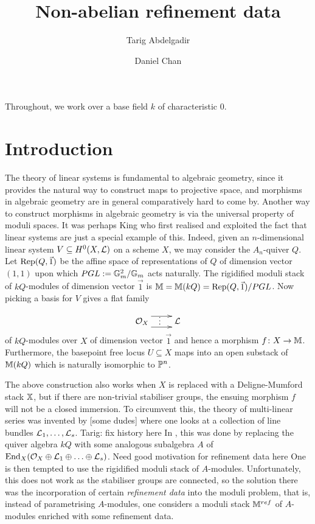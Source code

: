 \documentclass[12pt]{amsart}
\title{Non-abelian refinement data}
\author{Tarig Abdelgadir}
\author{Daniel Chan}
\begin{document}
\maketitle

Throughout, we work over a base field $k$ of characteristic 0.

\section{Introduction}
The theory of linear systems is fundamental to algebraic geometry, since it provides the natural way to construct maps to projective space, and morphisms in algebraic geometry are in general comparatively hard to come by. Another way to construct morphisms in algebraic geometry is via the universal property of moduli spaces. It was perhaps King who first realised and exploited the fact that linear systems are just a special example of this. Indeed, given an $n$-dimensional linear system $V \subseteq H^0(X,\mathcal{L})$ on a scheme $X$, we may consider the $A_n$-quiver $Q$. 
Let $\operatorname{Rep}(Q,\vec{1})$ be the affine space of representations of $Q$ of dimension vector $(1,1)$ upon which $PGL:= \mathbb{G}_m^2/\mathbb{G}_m$ acts naturally. The rigidified moduli stack of $kQ$-modules of dimension vector $\vec{1}$ is $\mathbb{M} = \mathbb{M}(kQ) = \operatorname{Rep}(Q,\vec{1})/PGL$. Now picking a basis for $V$ gives a flat family 
$$
\xymatrix{
\cO_X \ar@<1.5ex>[r] \ar@<-1.5ex>[r]^{\vdots} & \cL
}
$$
of $kQ$-modules over $X$ of dimension vector $\vec{1}$ and hence a morphism $f \colon X \to \mathbb{M}$. Furthermore, the basepoint free locus $U \subseteq X$ maps into an open substack of $\mathbb{M}(kQ)$ which is naturally isomorphic to $\mathbb{P}^n$. 

The above construction also works when $X$ is replaced with a Deligne-Mumford stack $\mathbb{X}$, but if there are non-trivial stabiliser groups, the ensuing morphism $f$ will not be a closed immersion. 
To circumvent this, the theory of multi-linear series was invented by [some dudes] where one looks at a collection of line bundles $\mathcal{L}_1, \ldots, \mathcal{L}_s$. {\red Tarig: fix history here} In \cite{Abd}, this was done by replacing the quiver algebra $kQ$ with some analogous subalgebra $A$ of $\operatorname{End}_X (\mathcal{O}_X \oplus \mathcal{L}_1 \oplus \ldots \oplus \mathcal{L}_s)$. 
{\red Need good motivation for refinement data here} 
One is then tempted to use the rigidified moduli stack of $A$-modules. Unfortunately, this does not work as the stabiliser groups are connected, so the solution there was the incorporation of certain {\em refinement data} into the moduli problem, that is, instead of parametrising $A$-modules, one considers a moduli stack $\mathbb{M}^{ref}$ of $A$-modules enriched with some refinement data. 
\end{document}
